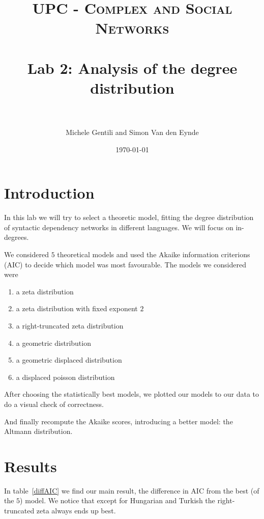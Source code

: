 \documentclass[paper=a4, fontsize=11pt]{scrartcl} %
\title{	
\normalfont \normalsize 
\textsc{UPC - Complex and Social Networks} \\ [25pt] %
\horrule{0.5pt} \\[0.4cm] %
\huge Lab 2: Analysis of the degree distribution\\ %
\horrule{2pt} \\[0.5cm] %
}
\author{Michele Gentili and Simon Van den Eynde} %
\date{\normalsize\today} %
\theoremstyle{plain}
\begin{document}
\maketitle %


\section{Introduction}
In this lab we will try to select a theoretic model, fitting the degree distribution of syntactic dependency networks in different languages. We will focus on in-degrees.

We considered $5$ theoretical models and used the Akaike information criterions (AIC) to decide which model was most favourable. The models we considered were
\begin{enumerate}
\item a zeta distribution
\item a zeta distribution with fixed exponent $2$
\item a right-truncated zeta distribution
\item a geometric distribution 
\item a geometric displaced distribution  
\item a displaced poisson distribution
\end{enumerate}

After choosing the statistically best models, we plotted our models to our data to do a visual check of correctness.

And finally recompute the Akaike scores, introducing a better model: the Altmann distribution.

\section{Results}

In table~\ref{diffAIC} we find our main result, the difference in AIC from the best (of the $5$) model. We notice that except for Hungarian and Turkish the right-truncated zeta always ends up best.\\
\end{document}
